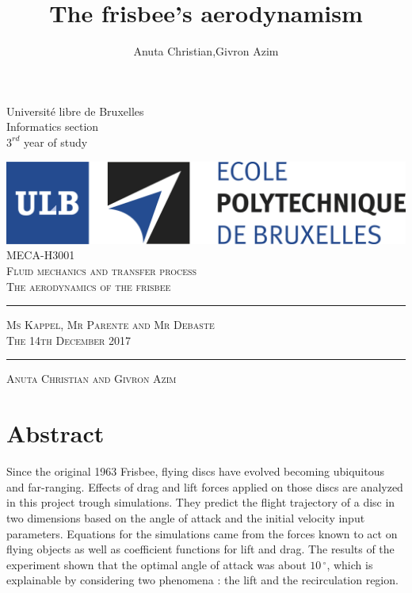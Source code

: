 \documentclass[10pt,a4paper]{report}
\author{Anuta Christian,Givron Azim}
\title{The frisbee's aerodynamism}
\begin{document}
\begin{titlepage}
\noindent Université libre de Bruxelles
\\Informatics section
\\$3^{rd}$ year of study

\center 
\includegraphics[scale=0.5]{logo-polytech-ULB-FR.jpg}\\
\vspace{5cm}
\textsc{\large MECA-H3001} \\[0.5cm]
\textsc{\LARGE Fluid mechanics and transfer process} \\[1.5cm]
\textsc{\Large The aerodynamics of the frisbee} \\[1.5cm]
\rule{\textwidth}{1pt}

\vspace{0.5cm}
\textsc{\small Ms Kappel, Mr Parente and Mr Debaste} \\[0.5cm]
\textsc{\small The 14th December 2017} \\[0.5cm]

\rule{\textwidth}{1pt}

\vspace{2cm}

\textsc{\large Anuta Christian and Givron Azim}

\end{titlepage}

\tableofcontents
\newpage 
\listoffigures
\newpage
\section{Abstract}
Since the original 1963 Frisbee, flying discs have evolved becoming ubiquitous and far-ranging. Effects of drag and lift forces applied on those discs are analyzed in this project trough simulations. They predict the flight trajectory of a disc in two dimensions based on the angle of attack and the initial velocity input parameters. Equations for the simulations came from the forces known to act on flying objects as well as coefficient functions for lift and drag. The results of the experiment shown that the optimal angle of attack was about $10\,^{\circ}$, which is explainable by considering two phenomena : the lift and the recirculation region.
\end{document}
